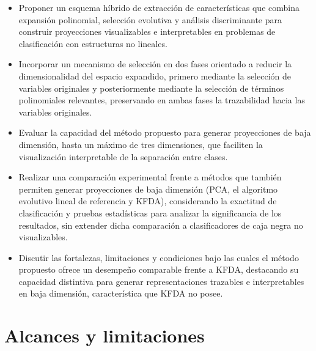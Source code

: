 	\begin{itemize}
		
		\item Proponer un esquema híbrido de extracción de características que combina expansión polinomial, selección evolutiva y análisis discriminante para construir proyecciones visualizables e interpretables en problemas de clasificación con estructuras no lineales.
		
		\item Incorporar un mecanismo de selección en dos fases orientado a reducir la dimensionalidad del espacio expandido, primero mediante la selección de variables originales y posteriormente mediante la selección de términos polinomiales relevantes, preservando en ambas fases la trazabilidad hacia las variables originales.
		
		\item Evaluar la capacidad del método propuesto para generar proyecciones de baja dimensión, hasta un máximo de tres dimensiones, que faciliten la visualización interpretable de la separación entre clases.
		
		\item Realizar una comparación experimental frente a métodos que también permiten generar proyecciones de baja dimensión (PCA, el algoritmo evolutivo lineal de referencia y KFDA), considerando la exactitud de clasificación y pruebas estadísticas para analizar la significancia de los resultados, sin extender dicha comparación a clasificadores de caja negra no visualizables.
		
		\item Discutir las fortalezas, limitaciones y condiciones bajo las cuales el método propuesto ofrece un desempeño comparable frente a KFDA, destacando su capacidad distintiva para generar representaciones trazables e interpretables en baja dimensión, característica que KFDA no posee.
		
	\end{itemize}
	
	\section{Alcances y limitaciones}
	\label{sec:Alcances-Limitaciones}
	

